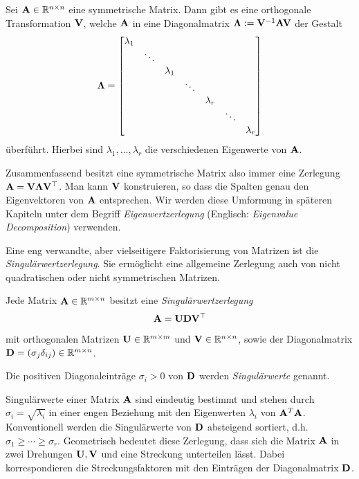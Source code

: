 \begin{thm}
Sei $\mathbf{A} \in \mathbb{R}^{n \times n}$ eine symmetrische Matrix. Dann gibt es eine orthogonale Transformation $\mathbf{V}$, welche $\mathbf{A}$ in eine Diagonalmatrix $\mathbf{\Lambda} \vcentcolon= \mathbf{V}^{-1}\mathbf{A}\mathbf{V}$ der Gestalt
$$\mathbf{\Lambda} = \begin{bmatrix}
    \lambda_{1} & & & & & & \\
    & \ddots & & & & & \\
    & & \lambda_1 & & & & \\
    & & & \ddots & & & \\
    & & & &\lambda_r & & \\
    & & & & & \ddots & \\
    & & & & & & \lambda_{r}
  \end{bmatrix}$$
überführt. Hierbei sind $\lambda_1, \ldots, \lambda_r$ die verschiedenen Eigenwerte von $\mathbf{A}$.
\end{thm}

Zusammenfassend besitzt eine symmetrische Matrix also immer eine Zerlegung $\mathbf{A} = \mathbf{V} \mathbf{\Lambda} \mathbf{V}^{\top}$. Man kann $\mathbf{V}$ konstruieren, so dass die Spalten genau den Eigenvektoren von $\mathbf{A}$ entsprechen. Wir werden diese Umformung in späteren Kapiteln unter dem Begriff \textit{Eigenwertzerlegung} (Englisch: \textit{Eigenvalue Decomposition}) verwenden. 

Eine eng verwandte, aber vielseitigere Faktorisierung von Matrizen ist die \textit{Singulärwertzerlegung}. Sie ermöglicht eine allgemeine Zerlegung auch von nicht quadratischen oder nicht symmetrischen Matrizen.

\begin{thm}
Jede Matrix $\mathbf{A} \in \mathbb{R}^{m \times n}$ besitzt eine \textit{Singulärwertzerlegung} 
$$\mathbf{A} = \mathbf{U}\mathbf{D}\mathbf{V}^{\top}$$
mit orthogonalen Matrizen $\mathbf{U} \in \mathbb{R}^{m \times m}$ und $\mathbf{V} \in \mathbb{R}^{n \times n}$, sowie der Diagonalmatrix $\mathbf{D} = (\sigma_j\delta_{ij}) \in \mathbb{R}^{m \times n}$.
\end{thm}

\begin{defn}[Singulärwert]
Die positiven Diagonaleinträge $\sigma_{i} > 0$ von $\mathbf{D}$ werden \textit{Singulärwerte} genannt.
\end{defn}

Singulärwerte einer Matrix $\mathbf{A}$ sind eindeutig bestimmt und stehen durch $\sigma_i = \sqrt{\lambda_i}$ in einer engen Beziehung mit den Eigenwerten $\lambda_i$ von $\mathbf{A}^T\mathbf{A}$. Konventionell werden die Singulärwerte von $\mathbf{D}$ absteigend sortiert, d.h. $\sigma _{1} \geq \cdots \geq \sigma _{r}$. Geometrisch bedeutet diese Zerlegung, dass sich die Matrix $\mathbf{A}$ in zwei Drehungen $\mathbf{U}, \mathbf{V}$ und eine Streckung unterteilen lässt. Dabei korrespondieren die Streckungsfaktoren mit den Einträgen der Diagonalmatrix $\mathbf{D}$.


